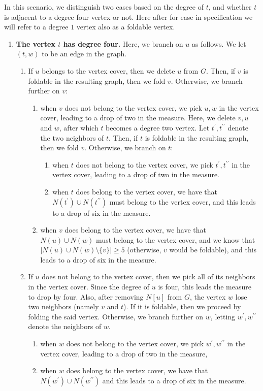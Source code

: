 \documentclass[svgnames]{llncs}
\begin{document}
{In this scenario, we distinguish two cases based on the degree of $t$, and whether $t$ is adjacent to a degree four vertex or not.
Here after for ease in specification we will refer to a degree $1$ vertex also as a foldable vertex. 

\begin{enumerate}[series=main,label=\bfseries Case~\arabic*:] \item {\bf The vertex $t$ has degree four.} Here, we branch on $u$ as follows. We let $(t,w)$ to be an edge in the graph.

\begin{enumerate}
\item If $u$ belongs to the vertex cover, then we delete $u$ from $G$. Then, if $v$ is foldable in the resulting graph, then we fold $v$. Otherwise, we branch further on $v$:
\begin{enumerate}
\item when $v$ does not belong to the vertex cover, we pick $u,w$ in the vertex cover, leading to a drop of two in the measure. Here, we delete $v,u$ and $w$, after which $t$ becomes a degree two vertex. Let $t^\prime,t^{\prime \prime}$ denote the two neighbors of $t$. Then, if $t$ is foldable in the resulting graph, then we fold $v$. Otherwise, we branch on $t$:
\begin{enumerate}
\item when $t$ does not belong to the vertex cover, we pick $t^\prime,t^{\prime\prime}$ in the vertex cover, leading to a drop of two in the measure.
\item when $t$ does belong to the vertex cover, we have that $N(t^\prime) \cup N(t^{\prime\prime})$ must belong to the vertex cover, and this leads to a drop of six in the measure.
\end{enumerate}
\item when $v$ does belong to the vertex cover, we have that $N(u) \cup N(w)$ must belong to the vertex cover, and we know that $|N(u) \cup N(w) \setminus \{v\}| \geq 5$ (otherwise, $v$ would be foldable), and this leads to a drop of six in the measure.
\end{enumerate}
\item If $u$ does not belong to the vertex cover, then we pick all of its neighbors in the vertex cover. Since the degree of $u$ is four, this leads the measure to drop by four. 
Also, after removing $N[u]$ from $G$, the vertex $w$ lose two neighbors (namely $v$ and $t$). If it is foldable, then we proceed by folding the said vertex. 
Otherwise, we branch further on $w$, letting $w^\prime,w^{\prime\prime}$ denote the neighbors of $w$.
\begin{enumerate}  
\item when $w$ does not belong to the vertex cover, we pick $w^\prime,w^{\prime\prime}$ in the vertex cover, leading to a drop of two in the measure,
\item when $w$ does belong to the vertex cover, we have that $N(w^\prime) \cup N(w^{\prime\prime})$ and this leads to a drop of six in the measure. 
\end{enumerate}
\end{enumerate}



\end{enumerate}}
\end{document}
